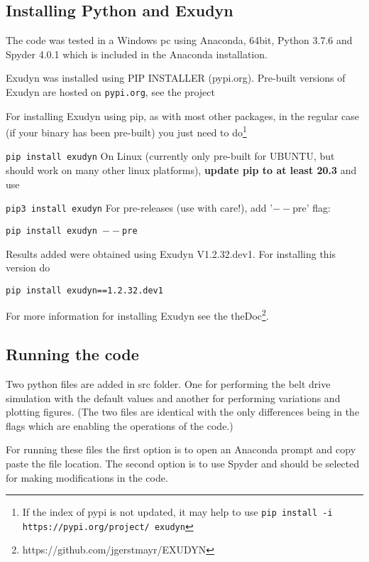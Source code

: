 \subsection{Installing Python and Exudyn}
The code was tested in a Windows pc using Anaconda, 64bit, Python 3.7.6 and Spyder 4.0.1 which is included in the Anaconda installation.

Exudyn was installed using PIP INSTALLER (pypi.org).
Pre-built versions of Exudyn are hosted on \texttt{pypi.org}, see the project
\bi
 \item {}
\ei
For installing Exudyn using pip, as with most other packages, in the regular case (if your binary has been pre-built) you just need to do\footnote{If the index of pypi is not updated, it may help to use \texttt{pip install -i https://pypi.org/project/ exudyn} }
\bi
  \item[] \texttt{pip install exudyn}
\ei
On Linux (currently only pre-built for UBUNTU, but should work on many other linux platforms), {\bf update pip to at least 20.3} and use 
\bi
  \item[] \texttt{pip3 install exudyn}
\ei
For pre-releases (use with care!), add '$--$pre' flag:
\bi
  \item[] \texttt{pip install exudyn $--$pre}
\ei  
  
Results added  
were obtained using Exudyn V1.2.32.dev1. For installing this version do
\bi
  \item[] \texttt{pip install exudyn==1.2.32.dev1}
\ei
             
For more information for installing Exudyn see the theDoc\footnote{https://github.com/jgerstmayr/EXUDYN}.
\subsection{Running the code}
Two python files are added in src folder. One for performing the belt drive simulation with the default values and another for performing variations and plotting figures. (The two files are identical with the only differences being in the flags which are enabling the operations of the code.)
 
For running these files the first option is to open an Anaconda prompt and copy paste the file location.
The second option is to use Spyder and should be selected for making modifications in the code. 

